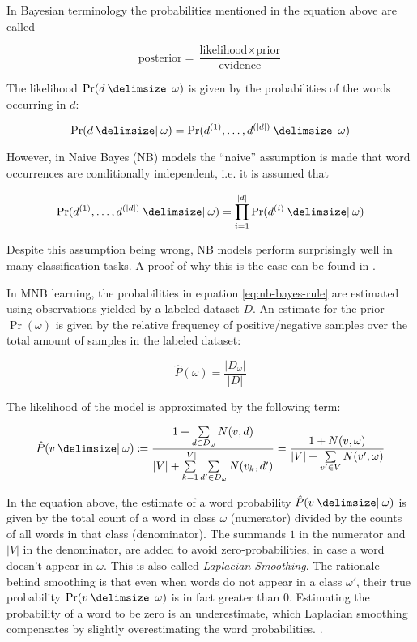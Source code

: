 In Bayesian terminology the probabilities mentioned in the equation above
are called

\begin{equation*}
	\text{posterior} = \frac{\text{likelihood}\times\text{prior}}{\text{evidence}}
\end{equation*}

The likelihood $\Pr(d\given \omega)$ is given by the
probabilities of the words occurring in $d$:

\begin{equation}
\label{eq:likelihood-full}
\Pr(d\given\omega) = \Pr(d^{(1)},\ldots,d^{(|d|)}\given\omega)
\end{equation}

However, in Naive Bayes (NB) models the ``naive'' assumption is made that word
occurrences are conditionally independent, i.e. it is assumed that

\begin{equation*}
\label{eq:naive-bayes-assumption}
\Pr(d^{(1)},\ldots,d^{(|d|)}\given\omega) = \prod\limits_{i=1}^{|d|}
\Pr(d^{(i)} \given \omega)
\end{equation*}

Despite this assumption being wrong, NB models perform surprisingly
well in many classification tasks. A proof of why this is
the case can be found in \cite{zhang2004optimality}.

In MNB learning, the probabilities in equation \ref{eq:nb-bayes-rule} are
estimated using observations yielded by a labeled dataset $D$. 
An estimate for the prior $\Pr(\omega)$ is given by the
relative frequency of positive/negative samples over the total amount of
samples in the labeled dataset:

\begin{equation}
\label{eq:priors}
\hat{P}(\omega) = \frac{|D_\omega|}{|D|}
\end{equation}

The likelihood of the model is approximated by the following term:

\begin{equation}
\label{eq:estimate-word-prob}
\hat{P}(v \given \omega) \coloneqq \frac{1+\sum\limits_{d \in
D_\omega}N(v,d)}{|V| + \sum\limits_{k=1}^{|V|} \sum\limits_{d' \in D_\omega}
N(v_k,d')} = \frac{1 + N(v,\omega)}{|V| + \sum\limits_{v' \in V} N(v', \omega)}
\end{equation}

In the equation above, the estimate of a word probability $\hat{P}(v \given \omega)$ is given by the
total count of a word in class $\omega$ (numerator) divided by the counts of all
words in that class (denominator). The summands $1$ in the numerator and $|V|$
in the denominator, are added to avoid zero-probabilities, in case a word
doesn't appear in $\omega$. This is also called \emph{Laplacian Smoothing}. The
rationale behind smoothing is that even when words do not appear in a
class $\omega'$, their true probability $\Pr(v \given \omega)$ is in fact
greater than 0.
Estimating the probability of a word to be zero is an underestimate, which
Laplacian smoothing compensates by slightly overestimating the word probabilities. 
\cite{mccallum1998comparison}.

